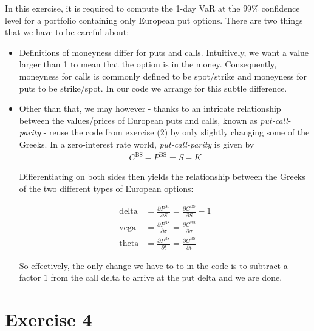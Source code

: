 \documentclass[10pt,a4paper]{article}
\theoremstyle{definition}
\begin{document}
	In this exercise, it is required to compute the 1-day VaR at the $99\%$ confidence level for a portfolio containing only European put options. There are two things that we have to be careful about:
	
	\begin{itemize}
	
	\item Definitions of moneyness differ for puts and calls. Intuitively, we want a value larger than 1 to mean that the option is in the money. Consequently, moneyness for calls is commonly defined to be spot/strike and moneyness for puts to be strike/spot. In our code we arrange for this subtle difference.
	
	\item  Other than that, we may however - thanks to an intricate relationship between the values/prices of European puts and calls, known as \emph{put-call-parity} \cite{G03} - reuse the code from exercise (2) by only slightly changing some of the Greeks. In a zero-interest rate world, \emph{put-call-parity} is given by	
	\begin{align*}
	C^{\text{BS}}- P^{\text{BS}} = S - K
	\end{align*}
	
	Differentiating on both sides then yields the relationship between the Greeks of the two different types of European options:
	
	\begin{align}
	\text{delta} &= \frac{\partial P^{\text{BS}}}{\partial S} = \frac{\partial C^{\text{BS}}}{\partial S} -1  \\
	\text{vega} &= \frac{\partial P^{\text{BS}}}{\partial \sigma} = \frac{\partial C^{\text{BS}}}{\partial \sigma} \\
	\text{theta} &= \frac{\partial P^{\text{BS}}}{\partial t} = \frac{\partial C^{\text{BS}}}{\partial t}
	\end{align}
	
	So effectively, the only change we have to to in the code is to subtract a factor $1$ from the call delta to arrive at the put delta and we are done.
	
	\end{itemize}
	
	
	\section*{Exercise 4}
	
\end{document}
